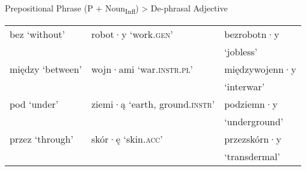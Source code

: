 \documentclass[output=paper]{LSP/langsci}
\begin{document}
\ea\label{ex:szymanek:20}
Prepositional Phrase (P + Noun\textsubscript{Infl})    >  De-phrasal Adjective\\
\begin{tabular}{lll}
 bez ‘without’  &  robot·y ‘work.{\textsc{gen}}’  &  bezrobotn·y      \\
&& ‘jobless’ \\
 między ‘between’  &wojn·ami ‘war.{\textsc{instr.pl}}’ &   międzywojenn·y \\
&&‘interwar’\\
 pod ‘under’  &  ziemi·ą ‘earth, ground.{\textsc{instr}}’ & podziemn·y\\ &&‘underground’\\
 przez ‘through’   & skór·ę ‘skin.{\textsc{acc}}’   &   przezskórn·y\\ &&‘transdermal’ \\
\end{tabular}
\z 
\end{document}
